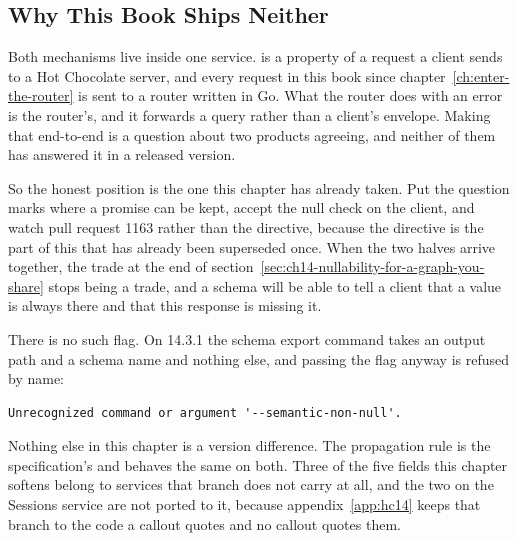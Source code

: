 \subsection{Why This Book Ships Neither}

%
Both mechanisms live inside one service.  is a property of a
request a client sends to a Hot Chocolate server, and every request in this book
since chapter~\ref{ch:enter-the-router} is sent to a router written in Go. What
the router does with an error is the router's, and it forwards a query rather
than a client's envelope. Making that end-to-end is a question about two
products agreeing, and neither of them has answered it in a released version.

%
So the honest position is the one this chapter has already taken. Put the
question marks where a promise can be kept, accept the null check on the client,
and watch pull request 1163 rather than the directive, because the directive is
the part of this that has already been superseded once. When the two halves
arrive together, the trade at the end of
section~\ref{sec:ch14-nullability-for-a-graph-you-share} stops being a trade,
and a schema will be able to tell a client that a value is always there and that
this response is missing it.

\begin{onhc14}
%
There is no such flag. On 14.3.1 the schema export command takes an output path
and a schema name and nothing else, and passing the flag anyway is refused by
name:

\begin{verbatim}
Unrecognized command or argument '--semantic-non-null'.
\end{verbatim}

Nothing else in this chapter is a version difference. The propagation rule is
the specification's and behaves the same on both. Three of the five fields this
chapter softens belong to services that branch does not carry at all, and the
two on the Sessions service are not ported to it, because
appendix~\ref{app:hc14} keeps that branch to the code a callout quotes and no
callout quotes them.
\end{onhc14}
%

